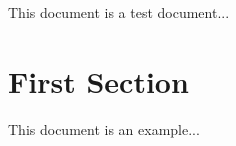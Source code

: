 \documentclass{article}
\begin{document}
\usepackage{babel}

This document is a test document...

\section{First Section}
This document is an example...
\end{document}
